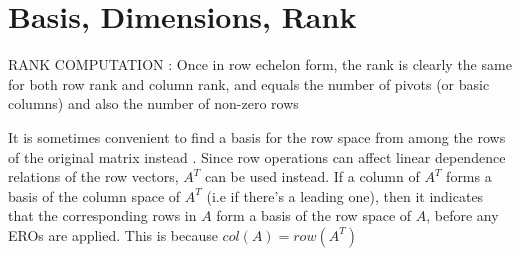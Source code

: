 \documentclass[english,course]{Notes}
\begin{document}
	      	\section{Basis, Dimensions, Rank}
	      	
	      	
	      	 RANK COMPUTATION : Once in row echelon form, the rank is clearly the same for both row rank and column rank, and equals the number of pivots (or basic columns) and also the number of non-zero rows
		
		\par{It is sometimes convenient to find a basis for the row space from among the rows of the original matrix instead . Since row operations can affect linear dependence relations of the row vectors, $A^{T}$ can be used instead. If a column of $A^{T}$ forms a basis of the column space of $A^{T}$ (i.e if there's a leading one), then it indicates that the corresponding rows in $A$ form a basis of the row space of $A$, before any EROs are applied. This is because $col(A) = row(A^{T})$  }
	      	
		
		
		
	      	
\end{document}
